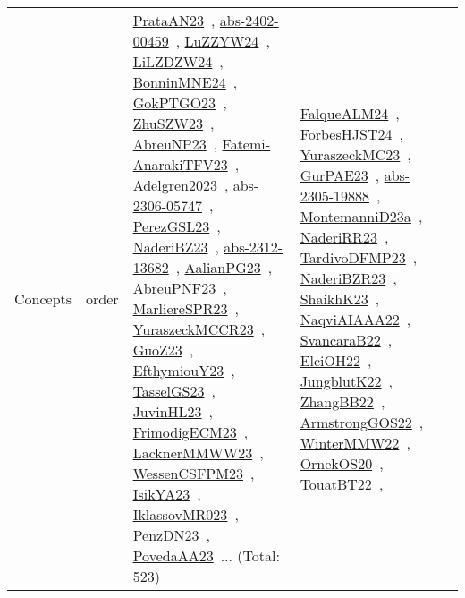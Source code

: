 {\begin{longtable}{lp{3cm}>{\raggedright\arraybackslash}p{6cm}>{\raggedright\arraybackslash}p{6cm}>{\raggedright\arraybackslash}p{8cm}}
\index{order}\index{Concepts!order}Concepts & order & \href{../works/PrataAN23.pdf}{PrataAN23}~\cite{PrataAN23}, \href{../works/abs-2402-00459.pdf}{abs-2402-00459}~\cite{abs-2402-00459}, \href{../works/LuZZYW24.pdf}{LuZZYW24}~\cite{LuZZYW24}, \href{../works/LiLZDZW24.pdf}{LiLZDZW24}~\cite{LiLZDZW24}, \href{../works/BonninMNE24.pdf}{BonninMNE24}~\cite{BonninMNE24}, \href{../works/GokPTGO23.pdf}{GokPTGO23}~\cite{GokPTGO23}, \href{../works/ZhuSZW23.pdf}{ZhuSZW23}~\cite{ZhuSZW23}, \href{../works/AbreuNP23.pdf}{AbreuNP23}~\cite{AbreuNP23}, \href{../works/Fatemi-AnarakiTFV23.pdf}{Fatemi-AnarakiTFV23}~\cite{Fatemi-AnarakiTFV23}, \href{../works/Adelgren2023.pdf}{Adelgren2023}~\cite{Adelgren2023}, \href{../works/abs-2306-05747.pdf}{abs-2306-05747}~\cite{abs-2306-05747}, \href{../works/PerezGSL23.pdf}{PerezGSL23}~\cite{PerezGSL23}, \href{../works/NaderiBZ23.pdf}{NaderiBZ23}~\cite{NaderiBZ23}, \href{../works/abs-2312-13682.pdf}{abs-2312-13682}~\cite{abs-2312-13682}, \href{../works/AalianPG23.pdf}{AalianPG23}~\cite{AalianPG23}, \href{../works/AbreuPNF23.pdf}{AbreuPNF23}~\cite{AbreuPNF23}, \href{../works/MarliereSPR23.pdf}{MarliereSPR23}~\cite{MarliereSPR23}, \href{../works/YuraszeckMCCR23.pdf}{YuraszeckMCCR23}~\cite{YuraszeckMCCR23}, \href{../works/GuoZ23.pdf}{GuoZ23}~\cite{GuoZ23}, \href{../works/EfthymiouY23.pdf}{EfthymiouY23}~\cite{EfthymiouY23}, \href{../works/TasselGS23.pdf}{TasselGS23}~\cite{TasselGS23}, \href{../works/JuvinHL23.pdf}{JuvinHL23}~\cite{JuvinHL23}, \href{../works/FrimodigECM23.pdf}{FrimodigECM23}~\cite{FrimodigECM23}, \href{../works/LacknerMMWW23.pdf}{LacknerMMWW23}~\cite{LacknerMMWW23}, \href{../works/WessenCSFPM23.pdf}{WessenCSFPM23}~\cite{WessenCSFPM23}, \href{../works/IsikYA23.pdf}{IsikYA23}~\cite{IsikYA23}, \href{../works/IklassovMR023.pdf}{IklassovMR023}~\cite{IklassovMR023}, \href{../works/PenzDN23.pdf}{PenzDN23}~\cite{PenzDN23}, \href{../works/PovedaAA23.pdf}{PovedaAA23}~\cite{PovedaAA23}... (Total: 523) & \href{../works/FalqueALM24.pdf}{FalqueALM24}~\cite{FalqueALM24}, \href{../works/ForbesHJST24.pdf}{ForbesHJST24}~\cite{ForbesHJST24}, \href{../works/YuraszeckMC23.pdf}{YuraszeckMC23}~\cite{YuraszeckMC23}, \href{../works/GurPAE23.pdf}{GurPAE23}~\cite{GurPAE23}, \href{../works/abs-2305-19888.pdf}{abs-2305-19888}~\cite{abs-2305-19888}, \href{../works/MontemanniD23a.pdf}{MontemanniD23a}~\cite{MontemanniD23a}, \href{../works/NaderiRR23.pdf}{NaderiRR23}~\cite{NaderiRR23}, \href{../works/TardivoDFMP23.pdf}{TardivoDFMP23}~\cite{TardivoDFMP23}, \href{../works/NaderiBZR23.pdf}{NaderiBZR23}~\cite{NaderiBZR23}, \href{../works/ShaikhK23.pdf}{ShaikhK23}~\cite{ShaikhK23}, \href{../works/NaqviAIAAA22.pdf}{NaqviAIAAA22}~\cite{NaqviAIAAA22}, \href{../works/SvancaraB22.pdf}{SvancaraB22}~\cite{SvancaraB22}, \href{../works/ElciOH22.pdf}{ElciOH22}~\cite{ElciOH22}, \href{../works/JungblutK22.pdf}{JungblutK22}~\cite{JungblutK22}, \href{../works/ZhangBB22.pdf}{ZhangBB22}~\cite{ZhangBB22}, \href{../works/ArmstrongGOS22.pdf}{ArmstrongGOS22}~\cite{ArmstrongGOS22}, \href{../works/WinterMMW22.pdf}{WinterMMW22}~\cite{WinterMMW22}, \href{../works/OrnekOS20.pdf}{OrnekOS20}~\cite{OrnekOS20}, \href{../works/TouatBT22.pdf}{TouatBT22}~\cite{TouatBT22}, 
\end{longtable}}
